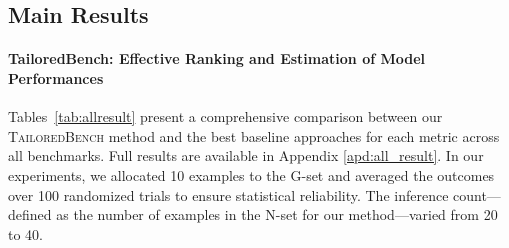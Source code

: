 





\subsection{Main Results}
\paragraph{TailoredBench: Effective Ranking and Estimation of Model Performances} Tables~\ref{tab:allresult} present a comprehensive comparison between our \textsc{TailoredBench} method and the best baseline approaches for each metric across all benchmarks. Full results are available in Appendix \ref{apd:all_result}. In our experiments, we allocated 10 examples to the G-set and averaged the outcomes over 100 randomized trials to ensure statistical reliability. The inference count—defined as the number of examples in the N-set for our method—varied from 20 to 40.


